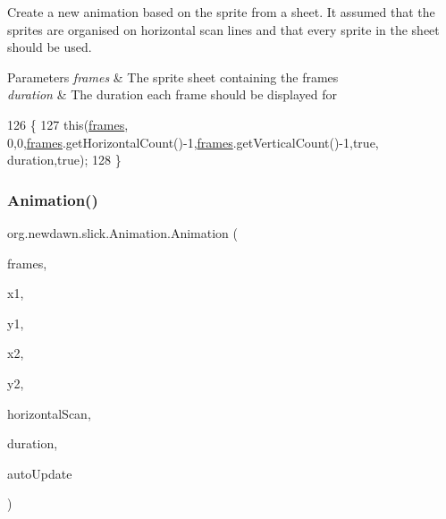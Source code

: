 Create a new animation based on the sprite from a sheet. It assumed that the sprites are organised on horizontal scan lines and that every sprite in the sheet should be used.


\begin{DoxyParams}{Parameters}
{\em frames} & The sprite sheet containing the frames \\
\hline
{\em duration} & The duration each frame should be displayed for \\
\hline
\end{DoxyParams}

\begin{DoxyCode}
126                                                        \{
127         \textcolor{keyword}{this}(\mbox{\hyperlink{classorg_1_1newdawn_1_1slick_1_1_animation_a39f0c6a16e479985b22f7dd3bb781bf7}{frames}}, 0,0,\mbox{\hyperlink{classorg_1_1newdawn_1_1slick_1_1_animation_a39f0c6a16e479985b22f7dd3bb781bf7}{frames}}.getHorizontalCount()-1,\mbox{\hyperlink{classorg_1_1newdawn_1_1slick_1_1_animation_a39f0c6a16e479985b22f7dd3bb781bf7}{frames}}.getVerticalCount()-1,\textcolor{keyword}{true},
      duration,\textcolor{keyword}{true});
128     \}
\end{DoxyCode}
\mbox{\label{classorg_1_1newdawn_1_1slick_1_1_animation_a417c8882467d579dcccd6befb0b7ae36}} 
\subsubsection{\texorpdfstring{Animation()}{Animation()}\hspace{0.1cm}{\footnotesize\ttfamily [8/9]}}
{\footnotesize\ttfamily org.\+newdawn.\+slick.\+Animation.\+Animation (\begin{DoxyParamCaption}\item[{\mbox{\hyperlink{classorg_1_1newdawn_1_1slick_1_1_sprite_sheet}{Sprite\+Sheet}}}]{frames,  }\item[{int}]{x1,  }\item[{int}]{y1,  }\item[{int}]{x2,  }\item[{int}]{y2,  }\item[{boolean}]{horizontal\+Scan,  }\item[{int}]{duration,  }\item[{boolean}]{auto\+Update }\end{DoxyParamCaption})\hspace{0.3cm}{\ttfamily [inline]}}


